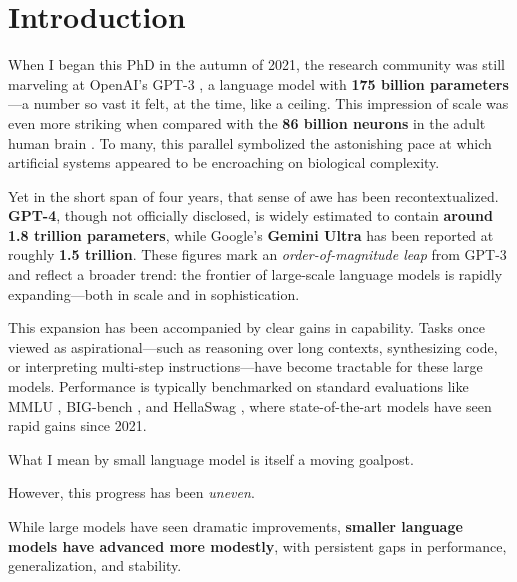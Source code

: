 \chapter{Introduction}



When I began this PhD in the autumn of 2021, the research community was still marveling at OpenAI’s GPT-3 \citep{brown2020gpt3}, a language model with \textbf{175 billion parameters}—a number so vast it felt, at the time, like a ceiling. This impression of scale was even more striking when compared with the \textbf{86 billion neurons} in the adult human brain \citep{azevedo2009neurons}. To many, this parallel symbolized the astonishing pace at which artificial systems appeared to be encroaching on biological complexity.

Yet in the short span of four years, that sense of awe has been recontextualized. \textbf{GPT-4}, though not officially disclosed, is widely estimated to contain \textbf{around 1.8 trillion parameters}, while Google’s \textbf{Gemini Ultra} has been reported at roughly \textbf{1.5 trillion}. These figures mark an \emph{order-of-magnitude leap} from GPT-3 and reflect a broader trend: the frontier of large-scale language models is rapidly expanding—both in scale and in sophistication.

This expansion has been accompanied by clear gains in capability. Tasks once viewed as aspirational—such as reasoning over long contexts, synthesizing code, or interpreting multi-step instructions—have become tractable for these large models. Performance is typically benchmarked on standard evaluations like MMLU \citep{hendrycks2021mmlu}, BIG-bench \citep{srivastava2023bigbench}, and HellaSwag \citep{zellers2019hellaswag}, where state-of-the-art models have seen rapid gains since 2021.

What I mean by small language model is itself a moving goalpost. 




 
However, this progress has been \emph{uneven}. 


While large models have seen dramatic improvements, \textbf{smaller language models have advanced more modestly}, with persistent gaps in performance, generalization, and stability.

